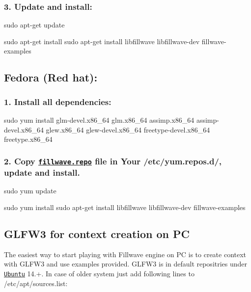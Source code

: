 \subsubsection*{3. Update and install\+:}


\begin{DoxyPre}{\ttfamily sudo apt-get update
}\end{DoxyPre}
  
\begin{DoxyPre}{\ttfamily sudo apt-get install sudo apt-get install libfillwave libfillwave-dev fillwave-examples
}\end{DoxyPre}
 

\subsection*{{\bfseries Fedora (Red hat)\+:}}

\subsubsection*{1. Install all dependencies\+:}


\begin{DoxyPre}
{\ttfamily 
sudo yum install glm-devel.x86\_64 glm.x86\_64 assimp.x86\_64 assimp-devel.x86\_64 glew.x86\_64 glew-devel.x86\_64 freetype-devel.x86\_64 freetype.x86\_64
}
\end{DoxyPre}


\subsubsection*{2. Copy \href{downloads/fillwave.repo}{\tt fillwave.\+repo} file in Your {\bfseries /etc/yum.repos.\+d/}, update and install.}


\begin{DoxyPre}{\ttfamily sudo yum update
}\end{DoxyPre}
  
\begin{DoxyPre}{\ttfamily sudo yum install sudo apt-get install libfillwave libfillwave-dev fillwave-examples
}\end{DoxyPre}
 

\subsection*{{\bfseries G\+L\+F\+W3 for context creation on P\+C}}

The easiest way to start playing with Fillwave engine on P\+C is to create context with G\+L\+F\+W3 and use examples provided. G\+L\+F\+W3 is in default repositries under \href{http://www.ubuntu.com/}{\tt Ubuntu} 14.+. In case of older system just add following lines to /etc/apt/sources.list\+:

